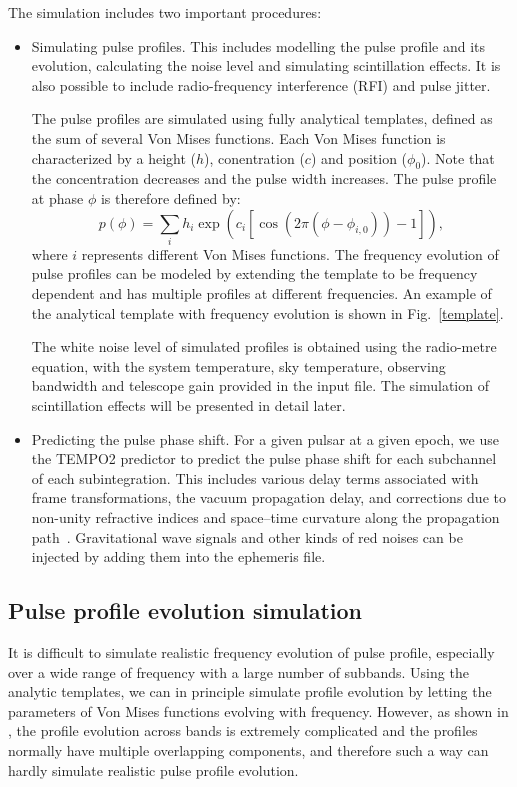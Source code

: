 \documentclass[useAMS,usenatbib]{mn2e}
\begin{document}
The simulation includes two important procedures:
\begin{itemize}
	\item Simulating pulse profiles. This includes modelling the pulse profile and its evolution, 
	calculating the noise level and simulating scintillation effects. It is also possible to include
	radio-frequency interference (RFI) and pulse jitter. 
	
	The pulse profiles are simulated using fully analytical templates, defined as the sum of  
	several Von Mises functions. Each Von Mises function is characterized by a height ($h$), 
	conentration ($c$) and position ($\phi_{0}$). Note that the concentration decreases and 
	the pulse width increases. The pulse profile at phase $\phi$ is therefore defined by:
	\begin{equation}
	p(\phi)=\sum_{i} h_{i}\exp(c_{i}[\cos(2\pi(\phi-\phi_{i,0}))-1]),
	\end{equation}
	where $i$ represents different Von Mises functions.
	The frequency evolution of pulse profiles can be modeled by extending the template to be 
	frequency dependent and has multiple profiles at different frequencies. An example of the 
	analytical template with frequency evolution is shown in Fig.~\ref{template}.

	The white noise level of simulated profiles is obtained using the radio-metre equation, 
	with the system temperature, sky temperature, observing bandwidth and telescope gain 
	provided in the input file. The simulation of scintillation effects will be presented in
	detail later.
	\item Predicting the pulse phase shift. For a given pulsar at a given epoch, we use the TEMPO2 
	predictor to predict the pulse phase shift for each subchannel of each subintegration. This includes 
	various delay terms associated with frame transformations, the vacuum propagation delay, and 
	corrections due to non-unity refractive indices and space–time curvature along the propagation 
	path~\citep{Edwards06}. Gravitational wave signals and other kinds of red noises can be 
	injected by adding them into the ephemeris file.
\end{itemize}

\subsection{Pulse profile evolution simulation}

It is difficult to simulate realistic frequency evolution of pulse profile, especially 
over a wide range of frequency with a large number of subbands. Using the analytic templates, 
we can in principle simulate profile evolution by letting the parameters of Von Mises functions 
evolving with frequency. However, as shown in \citet{Dai15}, the profile evolution across 
bands is extremely complicated and the profiles normally have multiple overlapping components, 
and therefore such a way can hardly simulate realistic pulse profile evolution.
\end{document}
